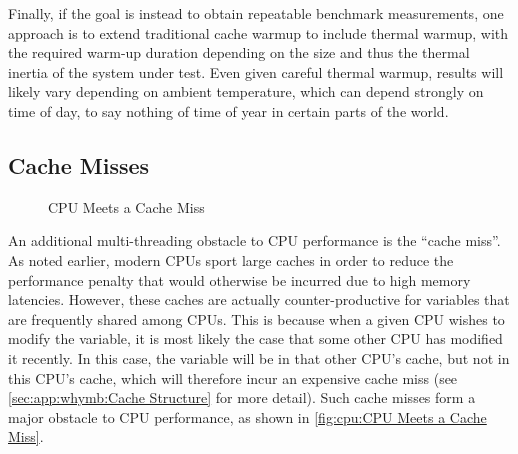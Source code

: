 Finally, if the goal is instead to obtain repeatable benchmark
measurements, one approach is to extend traditional cache warmup to
include thermal warmup, with the required warm-up duration depending on
the size and thus the thermal inertia of the system under test.
Even given careful thermal warmup, results will likely vary depending
on ambient temperature, which can depend strongly on time of day, to
say nothing of time of year in certain parts of the world.

\QuickQuizEnd

\subsection{Cache Misses}
\label{sec:cpu:Cache Misses}

\begin{figure}
\centering
{}
\caption{CPU Meets a Cache Miss}
\end{figure}

An additional multi-threading obstacle to CPU performance is
the ``cache miss''.
As noted earlier, modern CPUs sport large caches in order to reduce the
performance penalty that would otherwise be incurred due to high memory
latencies.
However, these caches are actually counter-productive for variables that
are frequently shared among CPUs.
This is because when a given CPU wishes to modify the variable, it is
most likely the case that some other CPU has modified it recently.
In this case, the variable will be in that other CPU's cache, but not
in this CPU's cache, which will therefore incur an expensive cache miss
(see \cref{sec:app:whymb:Cache Structure} for more detail).
Such cache misses form a major obstacle to CPU performance, as shown
in \cref{fig:cpu:CPU Meets a Cache Miss}.

